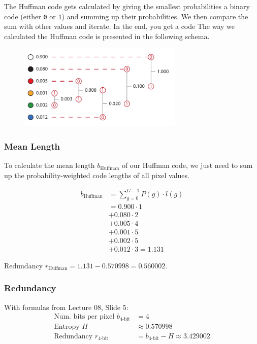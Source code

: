 \documentclass[a4paper,12pt]{article}
\begin{document}
	The Huffman code gets calculated by giving the smallest probabilities a binary code (either \texttt{0} or \texttt{1}) and summing up their probabilities. We then compare the sum with other values and iterate. In the end, you get a code The way we calculated the Huffman code is presented in the following schema.
	
	\begin{figure}[h!]
		\centering
		\includegraphics[width=0.7\textwidth]{huffman.pdf}
	\end{figure}
	
	\newpage
	
	\subsubsection{Mean Length}
	
	To calculate the mean length $b_\text{Huffman}$ of our Huffman code, we just need to sum up the probability-weighted code lengths of all pixel values.
	
	\begin{align*}
		b_\text{Huffman} &= \sum\limits_{g = 0}^{G - 1} P(g) \cdot l(g)\\
			&= 0.900 \cdot 1\\
			&+ 0.080 \cdot 2\\
			&+ 0.005 \cdot 4\\
			&+ 0.001 \cdot 5\\
			&+ 0.002 \cdot 5\\
			&+ 0.012 \cdot 3 = 1.131
	\end{align*}
	
	{\footnotesize Redundancy $r_\text{Huffman} = 1.131 - 0.570998 = 0.560002$.}
	
	\subsubsection{Redundancy}
	
	{\footnotesize With formulas from Lecture 08, Slide 5:}
	\begin{align*}
		\text{Num. bits per pixel }b_\text{4-bit} &= 4 \\
		\text{Entropy }H &\approx 0.570998\\
		\text{Redundancy }r_\text{4-bit} &= b_\text{4-bit} - H \approx 3.429002
	\end{align*}
	
\end{document}
